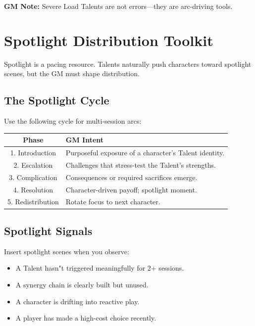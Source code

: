 \documentclass[11pt]{book}
\begin{document}
\textbf{GM Note:} Severe Load Talents are not errors---they are arc-driving tools.

\section{Spotlight Distribution Toolkit}

Spotlight is a pacing resource.  
Talents naturally push characters toward spotlight scenes, but the GM must shape distribution.

\subsection{The Spotlight Cycle}

Use the following cycle for multi-session arcs:

\begin{center}
\begin{longtable}{|c|p{9cm}|}
\hline
\textbf{Phase} & \textbf{GM Intent} \\ \hline
1. Introduction & Purposeful exposure of a character's Talent identity. \\ \hline
2. Escalation & Challenges that stress-test the Talent's strengths. \\ \hline
3. Complication & Consequences or required sacrifices emerge. \\ \hline
4. Resolution & Character-driven payoff; spotlight moment. \\ \hline
5. Redistribution & Rotate focus to next character. \\ \hline
\end{longtable}
\end{center}

\subsection{Spotlight Signals}

Insert spotlight scenes when you observe:

\begin{itemize}
    \item A Talent hasn"t triggered meaningfully for 2+ sessions.
    \item A synergy chain is clearly built but unused.
    \item A character is drifting into reactive play.
    \item A player has made a high-cost choice recently.
\end{itemize}
\end{document}
